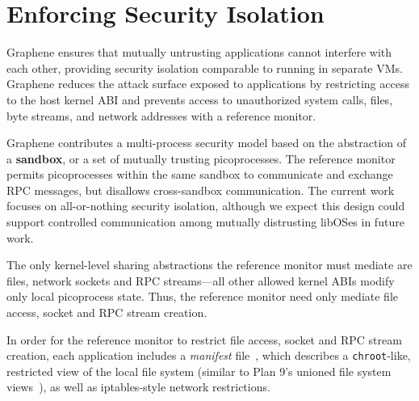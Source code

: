 \section{Enforcing Security Isolation}
\label{sec:security}
\label{sec:syscall-restrict}

Graphene ensures that mutually untrusting applications 
cannot interfere with each other, providing security isolation
comparable to running in separate VMs.
Graphene reduces the attack surface exposed to applications
by restricting access to the host kernel ABI 
and prevents access to unauthorized system calls, files, byte streams,
and network addresses with a reference monitor.

Graphene contributes a multi-process security model 
based on the abstraction of a {\bf sandbox},
or a set of mutually trusting picoprocesses.
The reference monitor permits picoprocesses within the same sandbox
to communicate and exchange RPC messages, but disallows cross-sandbox communication.
The current work focuses on all-or-nothing security isolation, although we expect
this design could support
controlled communication among mutually distrusting libOSes
in future work.


The only kernel-level sharing abstractions the reference monitor must mediate
are files, network sockets and RPC streams---all other allowed kernel ABIs
modify only local picoprocess state.
Thus, the reference monitor need only mediate file access, socket and RPC stream creation.


In order for the reference monitor to restrict file access, socket and RPC stream creation,
each application includes a {\em manifest} file~\cite{hunt07rethink},
which describes a {\tt chroot}-like, restricted view of the local 
file system (similar to Plan 9's unioned file system views~\cite{pike90plan9}),
as well as iptables-style network restrictions.



